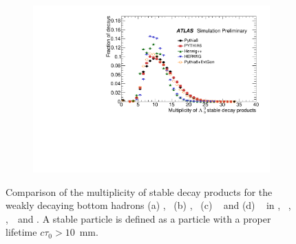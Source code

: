 \begin{figure}
\begin{subfigure}[]{0.45\textwidth}
\end{subfigure}
\begin{subfigure}[]{0.45\textwidth}
\includegraphics[width=\textwidth]{evtgen/figures/EvtGen/Lambdab0/h_species_multiplicity.pdf}
\end{subfigure}
\caption{Comparison of the multiplicity of stable decay products for the weakly decaying bottom hadrons 
(a) \Bo,~ (b) \Bp,~ (c) \Bs~ and (d) \Lb~
in \PythiaE,~ \Pythia,~ \Herwigpp,~\Herwig\ and \EvtGen.  A stable particle is defined
as a particle with a proper lifetime $c\tau_{0}>10$~mm. }
\label{fig:bmult}
\end{figure}

